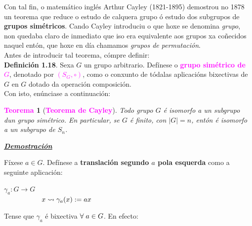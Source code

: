 \documentclass[twoside]{report}
\newcommand{\magbf}[1]{\textcolor{magenta}{\textbf{#1}}} %
\theoremstyle{mystyle}
\newtheorem{theo}{\magbf{Teorema}}[chapter]
\newenvironment{theorem}
{\begin{mdframed}[linecolor = magenta,backgroundcolor = classicrose, linewidth = 2mm]\begin{theo}}
{\end{theo}\end{mdframed}}
\begin{document}
\noindent Con tal fin, o matemático inglés Arthur Cayley (1821-1895) demostrou no 1878 un teorema que reduce o estudo de calquera grupo ó estudo dos subgrupos de \textbf{grupos simétricos}. Cando Cayley introduciu o que hoxe se denomina \textit{grupo}, non quedaba claro de inmediato que iso era equivalente aos grupos xa coñecidos naquel entón, que hoxe en día chamamos \textit{grupos de permutación}.\\

\noindent Antes de introducir tal teorema, cómpre definir: \\

\noindent \textbf{Definición 1.18}. Sexa $G$ un grupo arbitrario. Defínese o \magbf{grupo simétrico de $G$}, denotado por \textcolor{magenta}{$(S_{G}, \circ)$}, como o conxunto de tódalas aplicacións bixectivas de $G$ en $G$ dotado da operación composición.\\

\noindent Con isto, enúnciase a continuación: \\

\begin{theorem}[\magbf{Teorema de Cayley}] \label{th1.9}
Todo grupo $G$ é isomorfo a un subgrupo dun grupo simétrico.
En particular, se $G$ é finito, con $|G| = n$, entón é isomorfo a un subgrupo de $S_{n}$.
\end{theorem}

\vspace{2mm}

\noindent \textbf{\textit{\underline{Demostración}}}

\vspace{2mm}

\noindent Fíxese $a \in G$. Defínese a \textbf{translación segundo $a$ pola esquerda} como a seguinte aplicación:\\

    \begin{center}
            $\gamma_{a}: G \longrightarrow G$ \\
        \vspace{2mm}
        $\hspace{19mm} x \leadsto \gamma_{a}(x) := ax$
    \end{center} 

\noindent Tense que $\gamma_{a}$ é bixectiva   $\forall \hspace{1mm} a \in G$. En efecto:
\end{document}
